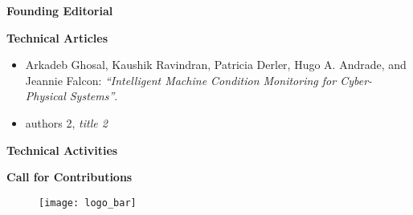 {
\setlength{\parskip}{.2in}

\textbf{Founding Editorial}

\textbf{Technical Articles}
\vspace{-.2in}
\begin{itemize}
    \item Arkadeb Ghosal, Kaushik Ravindran, Patricia Derler, Hugo A. Andrade, and Jeannie Falcon:
    \textit{``Intelligent Machine Condition Monitoring for Cyber-Physical Systems''}.
    \item authors 2,
    \textit{title 2}
\end{itemize}

\textbf{Technical Activities}

\textbf{Call for Contributions}

}


\begin{figure}[b!]
  \centering
  \texttt{[image: logo\_bar]}
  \caption*{}
\end{figure}



